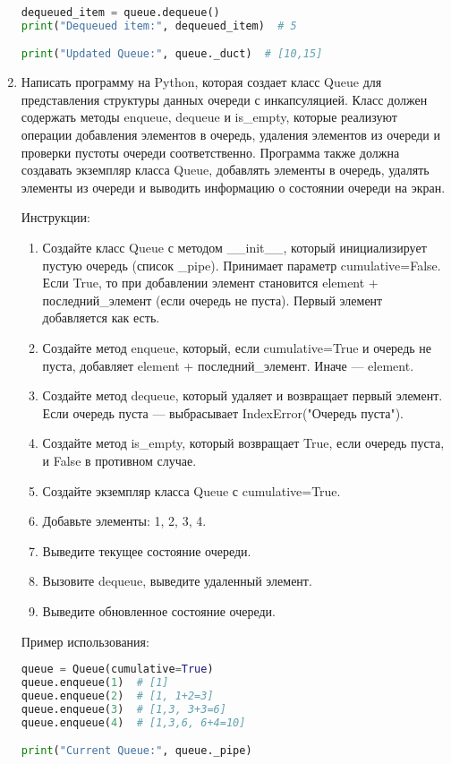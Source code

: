 \begin{enumerate}
\begin{lstlisting}[language=Python]
dequeued_item = queue.dequeue()
print("Dequeued item:", dequeued_item)  # 5

print("Updated Queue:", queue._duct)  # [10,15]
\end{lstlisting}

\item Написать программу на Python, которая создает класс Queue для представления структуры данных очереди с инкапсуляцией. Класс должен содержать методы enqueue, dequeue и is\_empty, которые реализуют операции добавления элементов в очередь, удаления элементов из очереди и проверки пустоты очереди соответственно. Программа также должна создавать экземпляр класса Queue, добавлять элементы в очередь, удалять элементы из очереди и выводить информацию о состоянии очереди на экран.

Инструкции:
\begin{enumerate}
    \item Создайте класс Queue с методом \_\_init\_\_, который инициализирует пустую очередь (список \_pipe). Принимает параметр cumulative=False. Если True, то при добавлении элемент становится element + последний\_элемент (если очередь не пуста). Первый элемент добавляется как есть.
    \item Создайте метод enqueue, который, если cumulative=True и очередь не пуста, добавляет element + последний\_элемент. Иначе — element.
    \item Создайте метод dequeue, который удаляет и возвращает первый элемент. Если очередь пуста — выбрасывает IndexError("Очередь пуста").
    \item Создайте метод is\_empty, который возвращает True, если очередь пуста, и False в противном случае.
    \item Создайте экземпляр класса Queue с cumulative=True.
    \item Добавьте элементы: 1, 2, 3, 4.
    \item Выведите текущее состояние очереди.
    \item Вызовите dequeue, выведите удаленный элемент.
    \item Выведите обновленное состояние очереди.
\end{enumerate}

Пример использования:
\begin{lstlisting}[language=Python]
queue = Queue(cumulative=True)
queue.enqueue(1)  # [1]
queue.enqueue(2)  # [1, 1+2=3]
queue.enqueue(3)  # [1,3, 3+3=6]
queue.enqueue(4)  # [1,3,6, 6+4=10]

print("Current Queue:", queue._pipe)


\end{lstlisting}
\end{enumerate}
